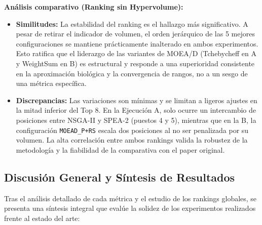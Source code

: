 \documentclass[a4paper,10pt]{article}
\begin{document}
\textbf{Análisis comparativo (Ranking sin Hypervolume):}
\begin{itemize}
    \item \textbf{Similitudes:} La estabilidad del ranking es el hallazgo más significativo. A pesar de retirar el indicador de volumen, el orden jerárquico de las 5 mejores configuraciones se mantiene prácticamente inalterado en ambos experimentos. Esto ratifica que el liderazgo de las variantes de MOEA/D (Tchebycheff en A y WeightSum en B) es estructural y responde a una superioridad consistente en la aproximación biológica y la convergencia de rangos, no a un sesgo de una métrica específica.
    \item \textbf{Discrepancias:} Las variaciones son mínimas y se limitan a ligeros ajustes en la mitad inferior del Top 8. En la Ejecución A, solo ocurre un intercambio de posiciones entre NSGA-II y SPEA-2 (puestos 4 y 5), mientras que en la B, la configuración \texttt{MOEAD\_P+RS} escala dos posiciones al no ser penalizada por su volumen. La alta correlación entre ambos rankings valida la robustez de la metodología y la fiabilidad de la comparativa con el paper original.
\end{itemize}

\subsection{Discusión General y Síntesis de Resultados}

Tras el análisis detallado de cada métrica y el estudio de los rankings globales, se presenta una síntesis integral que evalúe la solidez de los experimentos realizados frente al estado del arte:
\end{document}
